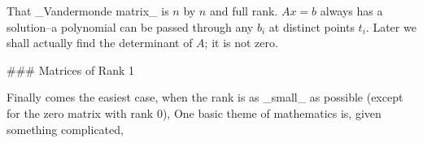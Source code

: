 That _Vandermonde matrix_ is \(n\) by \(n\) and full rank. \(Ax=b\) always has a solution--a polynomial can be passed through any \(b_{i}\) at distinct points \(t_{i}\). Later we shall actually find the determinant of \(A\); it is not zero.

### Matrices of Rank 1

Finally comes the easiest case, when the rank is as _small_ as possible (except for the zero matrix with rank 0), One basic theme of mathematics is, given something complicated, 